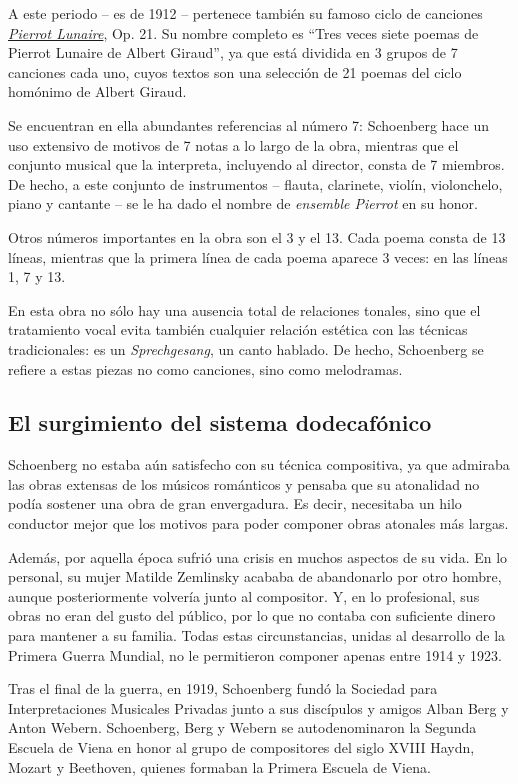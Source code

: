 A este periodo -- es de 1912 -- pertenece tambi\'en su famoso ciclo de canciones \href{https://www.youtube.com/watch?v=vQVkbKULKpI}{\emph{Pierrot Lunaire}}, Op. 21. Su nombre completo es ``Tres veces siete poemas de Pierrot Lunaire de Albert Giraud'', ya que est\'a dividida en 3 grupos de 7 canciones cada uno, cuyos textos son una selecci\'on de 21 poemas del ciclo hom\'onimo de Albert Giraud. 

Se encuentran en ella abundantes referencias al n\'umero 7: Schoenberg hace un uso extensivo de motivos de 7 notas a lo largo de la obra, mientras que el conjunto musical que la interpreta, incluyendo al director, consta de 7 miembros. De hecho, a este conjunto de instrumentos -- flauta, clarinete, viol\'in, violonchelo, piano y cantante -- se le ha dado el nombre de \textit{ensemble Pierrot} en su honor. 

Otros n\'umeros importantes en la obra son el 3 y el 13. Cada poema consta de 13 l\'ineas, mientras que la primera l\'inea de cada poema aparece 3 veces: en las l\'ineas 1, 7 y 13.

En esta obra no s\'olo hay una ausencia total de relaciones tonales, sino que el tratamiento vocal evita tambi\'en cualquier relaci\'on est\'etica con las t\'ecnicas tradicionales: es un \emph{Sprechgesang}, un canto hablado. De hecho, Schoenberg se refiere a estas piezas no como canciones, sino como melodramas. \cite{diaz}

\subsection{El surgimiento del sistema dodecaf\'onico}
Schoenberg no estaba a\'un satisfecho con su t\'ecnica compositiva, ya que admiraba las obras extensas de los m\'usicos rom\'anticos y pensaba que su atonalidad no pod\'ia sostener una obra de gran envergadura. Es decir, necesitaba un hilo conductor mejor que los motivos para poder componer obras atonales m\'as largas.

Adem\'as, por aquella \'epoca sufri\'o una crisis en muchos aspectos de su vida. En lo personal, su mujer Matilde Zemlinsky acababa de abandonarlo por otro hombre, aunque posteriormente volver\'ia junto al compositor. Y, en lo profesional, sus obras no eran del gusto del p\'ublico, por lo que no contaba con suficiente dinero para mantener a su familia. Todas estas circunstancias, unidas al desarrollo de la Primera Guerra Mundial, no le permitieron componer apenas entre 1914 y 1923.

Tras el final de la guerra, en 1919, Schoenberg fund\'o la Sociedad para Interpretaciones Musicales Privadas junto a sus disc\'ipulos y amigos Alban Berg y Anton Webern. Schoenberg, Berg y Webern se autodenominaron la Segunda Escuela de Viena en honor al grupo de compositores del siglo XVIII Haydn, Mozart y Beethoven, quienes formaban la Primera Escuela de Viena.%

